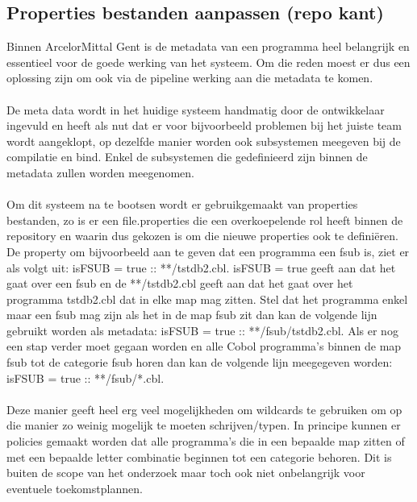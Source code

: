 \subsection{Properties bestanden aanpassen (repo kant)}
Binnen ArcelorMittal Gent is de metadata van een programma heel belangrijk en essentieel voor de goede werking van het systeem. Om die reden moest er dus een oplossing zijn om ook via de pipeline werking aan die metadata te komen. 
\\ \\
De meta data wordt in het huidige systeem handmatig door de ontwikkelaar ingevuld en heeft als nut dat er voor bijvoorbeeld problemen bij het juiste team wordt aangeklopt, op dezelfde manier worden ook subsystemen meegeven bij de compilatie en bind. Enkel de subsystemen die gedefinieerd zijn binnen de metadata zullen worden meegenomen. 
\\ \\
Om dit systeem na te bootsen wordt er gebruikgemaakt van properties bestanden, zo is er een file.properties die een overkoepelende rol heeft binnen de repository en waarin dus gekozen is om die nieuwe properties ook te definiëren. De property om bijvoorbeeld aan te geven dat een programma een fsub is, ziet er als volgt uit:  isFSUB = true :: **/tstdb2.cbl. isFSUB = true geeft aan dat het gaat over een fsub en de **/tstdb2.cbl geeft aan dat het gaat over het programma tstdb2.cbl dat in elke map mag zitten. Stel dat het programma enkel maar een fsub mag zijn als het in de map fsub zit dan kan de volgende lijn gebruikt worden als metadata: isFSUB = true :: **/fsub/tstdb2.cbl. Als er nog een stap verder moet gegaan worden en alle Cobol programma's binnen de map fsub tot de categorie fsub horen dan kan de volgende lijn meegegeven worden: isFSUB = true :: **/fsub/*.cbl. 
\\ \\
Deze manier geeft heel erg veel mogelijkheden om wildcards te gebruiken om op die manier zo weinig mogelijk te moeten schrijven/typen. In principe kunnen er policies gemaakt worden dat alle programma's die in een bepaalde map zitten of met een bepaalde letter combinatie beginnen tot een categorie behoren. Dit is buiten de scope van het onderzoek maar toch ook niet onbelangrijk voor eventuele toekomstplannen. 



